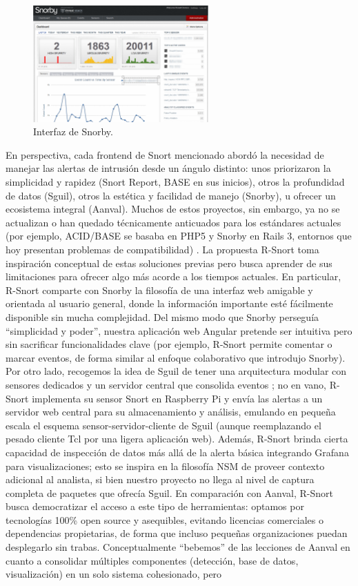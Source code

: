 \documentclass[11pt,a4paper,twoside]{report}
\begin{document}
\begin{figure}[H]
	\centering
	\includegraphics[width=0.6\textwidth]{documento/22.png}
	\caption{Interfaz de Snorby.}
	\label{fig:snorby}
\end{figure}

En perspectiva, cada frontend de Snort mencionado abordó la necesidad de manejar las alertas de intrusión desde un ángulo distinto: unos priorizaron la simplicidad y rapidez (Snort Report, BASE en sus inicios), otros la profundidad de datos (Sguil), otros la estética y facilidad de manejo (Snorby), u ofrecer un ecosistema integral (Aanval). Muchos de estos proyectos, sin embargo, ya no se actualizan o han quedado técnicamente anticuados para los estándares actuales (por ejemplo, ACID/BASE se basaba en PHP5 y Snorby en Rails 3, entornos que hoy presentan problemas de compatibilidad) \cite{StackExchange2011}. La propuesta R-Snort toma inspiración conceptual de estas soluciones previas pero busca aprender de sus limitaciones para ofrecer algo más acorde a los tiempos actuales. En particular, R-Snort comparte con Snorby la filosofía de una interfaz web amigable y orientada al usuario general, donde la información importante esté fácilmente disponible sin mucha complejidad. Del mismo modo que Snorby perseguía “simplicidad y poder”, nuestra aplicación web Angular pretende ser intuitiva pero sin sacrificar funcionalidades clave (por ejemplo, R-Snort permite comentar o marcar eventos, de forma similar al enfoque colaborativo que introdujo Snorby). Por otro lado, recogemos la idea de Sguil de tener una arquitectura modular con sensores dedicados y un servidor central que consolida eventos \cite{sectoolsSguil}; no en vano, R-Snort implementa su sensor Snort en Raspberry Pi y envía las alertas a un servidor web central para su almacenamiento y análisis, emulando en pequeña escala el esquema sensor-servidor-cliente de Sguil (aunque reemplazando el pesado cliente Tcl por una ligera aplicación web). Además, R-Snort brinda cierta capacidad de inspección de datos más allá de la alerta básica integrando Grafana para visualizaciones; esto se inspira en la filosofía NSM de proveer contexto adicional al analista, si bien nuestro proyecto no llega al nivel de captura completa de paquetes que ofrecía Sguil. En comparación con Aanval, R-Snort busca democratizar el acceso a este tipo de herramientas: optamos por tecnologías 100\% open source y asequibles, evitando licencias comerciales o dependencias propietarias, de forma que incluso pequeñas organizaciones puedan desplegarlo sin trabas. Conceptualmente “bebemos” de las lecciones de Aanval en cuanto a consolidar múltiples componentes (detección, base de datos, visualización) en un solo sistema cohesionado, pero 
\end{document}
